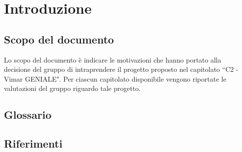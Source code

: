 \section{Introduzione}
\subsection{Scopo del documento}
Lo scopo del documento è indicare le motivazioni che hanno portato alla decisione del gruppo di intraprendere il progetto proposto nel capitolato ``C2 - Vimar GENIALE".
Per ciascun capitolato disponibile vengono riportate le valutazioni del gruppo riguardo tale progetto.
\subsection{Glossario}

\subsection{Riferimenti}
